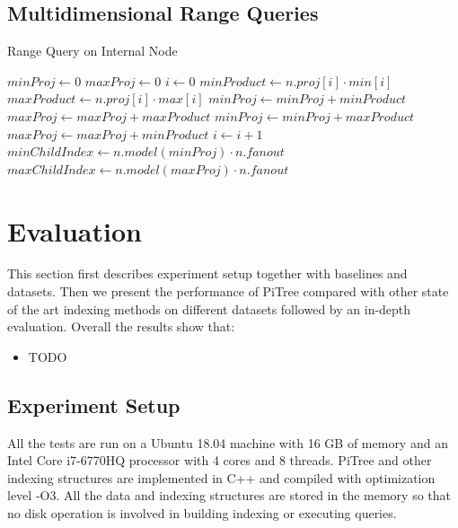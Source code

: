 \documentclass[sigconf,10pt]{acmart}
\begin{document}
\subsection{Multidimensional Range Queries}

\begin{algorithm}
  \caption{Range Query on Internal Node}
  \begin{algorithmic}[1]
  \State {}
  \State \Return{}
  \EndIf
  \State $minProj\gets 0$
  \State $maxProj\gets 0$
  \State $i\gets 0$
  \State $minProduct\gets n.proj[i] \cdot min[i]$
  \State $maxProduct\gets n.proj[i] \cdot max[i]$
  \State $minProj\gets minProj + minProduct$
  \State $maxProj\gets maxProj + maxProduct$
  \Else
  \State $minProj\gets minProj + maxProduct$
  \State $maxProj\gets maxProj + minProduct$
  \EndIf
  \State $i\gets i+1$
  \EndWhile
  \State $minChildIndex\gets n.model(minProj) \cdot n.fanout$
  \State $maxChildIndex\gets n.model(maxProj) \cdot n.fanout$
  \State {}
  \EndFor
  \EndProcedure
  \end{algorithmic}
  \end{algorithm}

\section{Evaluation}

This section first describes experiment setup together with baselines and datasets. 
Then we present the performance of PiTree compared with other state of the art 
indexing methods on different datasets followed by an in-depth evaluation. 
Overall the results show that:
\begin{itemize}
    \item TODO
\end{itemize}

\subsection{Experiment Setup}

All the tests are run on a Ubuntu 18.04 machine with 16 GB of memory and an Intel 
Core i7-6770HQ processor with 4 cores and 8 threads. PiTree and other indexing 
structures are implemented in C++ and compiled with optimization level -O3. 
All the data and indexing structures are stored in the memory so that no disk 
operation is involved in building indexing or executing queries.
\end{document}
